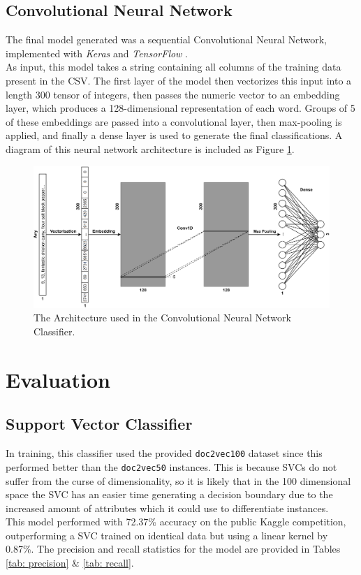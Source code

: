 \documentclass[twocolumn, 11pt]{article}
\begin{document}
\subsection{Convolutional Neural Network} 
The final model generated was a sequential Convolutional Neural Network, implemented with \textit{Keras} \cite{chollet2015keras} and \textit{TensorFlow} \cite{tensorflow2015}.\\[2mm]
As input, this model takes a string containing all columns of the training data present in the CSV. The first layer of the model then vectorizes this input into a length 300 tensor of integers, then passes the numeric vector to an embedding layer, which produces a 128-dimensional representation of each word. Groups of 5 of these embeddings are passed into a convolutional layer, then max-pooling is applied, and finally a dense layer is used to generate the final classifications. A diagram of this neural network architecture is included as Figure \ref{fig: NN architecture}.
\begin{figure}[!ht]
    \centering
    \includegraphics[width=\textwidth]{architecture.png}
    \caption{The Architecture used in the Convolutional Neural Network Classifier.}
    \label{fig: NN architecture}
\end{figure}
\section{Evaluation}
\subsection{Support Vector Classifier}
In training, this classifier used the provided \verb|doc2vec100| dataset since this performed better than the \verb|doc2vec50| instances. This is because SVCs do not suffer from the curse of dimensionality, so it is likely that in the 100 dimensional space the SVC has an easier time generating a decision boundary due to the increased amount of attributes which it could use to differentiate instances.\\[2mm]
This model performed with 72.37\% accuracy on the public Kaggle competition, outperforming a SVC trained on identical data but using a linear kernel by 0.87\%. The precision and recall statistics for the model are provided in Tables \ref{tab: precision} \& \ref{tab: recall}.
\end{document}

